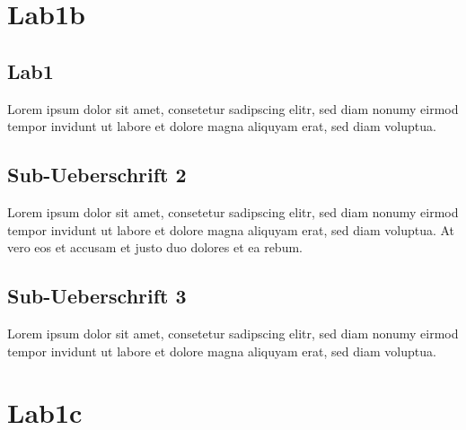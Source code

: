 \documentclass[12pt,a4paper,titlepage,oneside]{scrartcl}
\begin{document}
\section{Lab1b}

\subsection{Lab1}
Lorem ipsum dolor sit amet, consetetur sadipscing elitr, sed diam nonumy eirmod tempor invidunt ut labore et dolore magna aliquyam erat, sed diam voluptua. 

\subsection{Sub-Ueberschrift 2}
Lorem ipsum dolor sit amet, consetetur sadipscing elitr, sed diam nonumy eirmod tempor invidunt ut labore et dolore magna aliquyam erat, sed diam voluptua. At vero eos et accusam et justo duo dolores et ea rebum. 

\subsection{Sub-Ueberschrift 3}
Lorem ipsum dolor sit amet, consetetur sadipscing elitr, sed diam nonumy eirmod tempor invidunt ut labore et dolore magna aliquyam erat, sed diam voluptua.

\section{Lab1c} 
\end{document}
